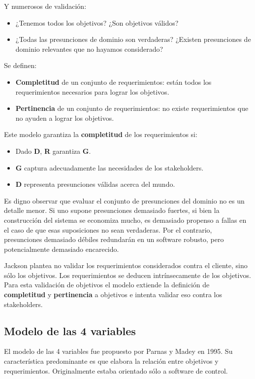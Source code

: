 \documentclass[]{article}
\begin{document}
Y numerosos de validación:
\begin{itemize}
	\item ¿Tenemos todos los objetivos? ¿Son objetivos válidos?
	\item ¿Todas las presunciones de dominio son verdaderas? ¿Existen presunciones de dominio relevantes que no hayamos considerado?
\end{itemize}

Se definen:
\begin{itemize}
	\item \textbf{Completitud} de un conjunto de requerimientos: están todos los requerimientos necesarios para lograr los objetivos.
	\item \textbf{Pertinencia} de un conjunto de requerimientos: no existe requerimientos que no ayuden a lograr los objetivos.
\end{itemize}

Este modelo garantiza la \textbf{completitud} de los requerimientos si:
\begin{itemize}
	\item Dado \textbf{D}, \textbf{R} garantiza \textbf{G}.
	\item \textbf{G} captura adecuadamente las necesidades de los stakeholders.
	\item \textbf{D} representa presunciones válidas acerca del mundo.
\end{itemize}

Es digno observar que evaluar el conjunto de presunciones del dominio no es un detalle menor. Si uno supone presunciones demasiado fuertes, si bien la construcción del sistema se economiza mucho, es demasiado propenso a fallas en el caso de que esas suposiciones no sean verdaderas. Por el contrario, presunciones demasiado débiles redundarán en un software robusto, pero potencialmente demasiado encarecido.


Jackson plantea no validar los requerimientos considerados contra el cliente, sino sólo los objetivos. Los requerimientos se deducen intrínsecamente de los objetivos. Para esta validación de objetivos el modelo extiende la definición de \textbf{completitud} y \textbf{pertinencia} a objetivos e intenta validar eso contra los stakeholders.


\subsection{Modelo de las 4 variables}
El modelo de las 4 variables fue propuesto por Parnas y Madey en 1995. Su característica predominante es que elabora la relación entre objetivos y requerimientos. Originalmente estaba orientado sólo a software de control.
\end{document}
